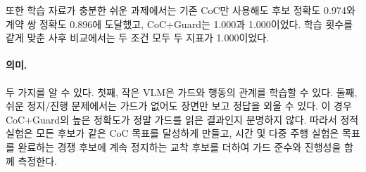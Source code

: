또한 학습 자료가 충분한 쉬운 과제에서는 기존 CoC만 사용해도 후보 정확도 0.974와 계약 쌍 정확도 0.896에 도달했고, CoC+Guard는 1.000과 1.000이었다. 학습 횟수를 같게 맞춘 사후 비교에서는 두 조건 모두 두 지표가 1.000이었다.

\paragraph{의미.}
두 가지를 알 수 있다. 첫째, 작은 VLM은 가드와 행동의 관계를 학습할 수 있다. 둘째, 쉬운 정지/진행 문제에서는 가드가 없어도 장면만 보고 정답을 외울 수 있다. 이 경우 CoC+Guard의 높은 정확도가 정말 가드를 읽은 결과인지 분명하지 않다. 따라서 정적 실험은 모든 후보가 같은 CoC 목표를 달성하게 만들고, 시간 및 다중 주행 실험은 목표를 완료하는 경쟁 후보에 계속 정지하는 교착 후보를 더하여 가드 준수와 진행성을 함께 측정한다.

